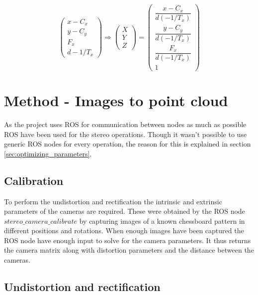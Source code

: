 \[
 \begin{pmatrix}
  x - C_{x} \\
  y - C_{y} \\
  F_{x} \\
  d-1/T_{x} 
 \end{pmatrix}
 \Rightarrow
  \begin{pmatrix}  
  X\\
  Y\\
  Z
 \end{pmatrix}
 =
 \begin{pmatrix}
  \dfrac{x - C_{x}}{ d(-1/T_{x})}  \\
  \dfrac{y - C_{y} }{ d(-1/T_{x})}\\
  \dfrac{F_{x}}{ d(-1/T_{x})}\\
  1
 \end{pmatrix}
\]

\section{Method - Images to point cloud}

As the project uses ROS for communication between nodes as much as possible ROS have been used for the stereo operations. Though it wasn't possible to use generic ROS nodes for every operation, the reason for this is explained in section \ref{sec:optimizing_parameters}. 

\subsection{Calibration} \label{sec:calibration}

To perform the undistortion and rectification the intrinsic and extrinsic parameters of the cameras are required. These were obtained by the ROS node $stereo\_camera\_calibrate$ by capturing images of a known chessboard pattern in different positions and rotations. When enough images have been captured the ROS node have enough input to solve for the camera parameters. It thus returns the camera matrix along with distortion parameters and the distance between the cameras.


\subsection{Undistortion and rectification}

